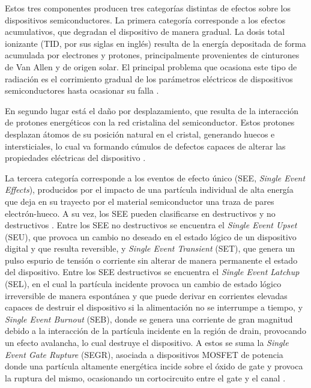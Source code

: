 Estos tres componentes producen tres categorías distintas de efectos sobre los dispositivos semiconductores. La primera categoría corresponde a los efectos acumulativos, que degradan el dispositivo de manera gradual. La dosis total ionizante (TID, por sus siglas en inglés) resulta de la energía depositada de forma acumulada por electrones y protones, principalmente provenientes de cinturones de Van Allen y de origen solar. El principal problema que ocasiona este tipo de radiación es el corrimiento gradual de los parámetros eléctricos de dispositivos semiconductores hasta ocasionar su falla \cite{mikaelian2001}. 

En segundo lugar está el daño por desplazamiento, que resulta de la interacción de protones energéticos con la red cristalina del semiconductor. Estos protones desplazan átomos de su posición natural en el cristal, generando huecos e intersticiales, lo cual va formando cúmulos de defectos capaces de alterar las propiedades eléctricas del dispositivo \cite{mikaelian2001}.
 
La tercera categoría corresponde a los eventos de efecto único (SEE, \textit{Single Event Effects}), producidos por el impacto de una partícula individual de alta energía que deja en su trayecto por el material semiconductor una traza de pares electrón-hueco. A su vez, los SEE pueden clasificarse en destructivos y no destructivos \cite{lauenstein2015}. Entre los SEE no destructivos se encuentra el \textit{Single Event Upset} (SEU), que provoca un cambio no deseado en el estado lógico de un dispositivo digital y que resulta reversible, y \textit{Single Event Transient} (SET), que genera un pulso espurio de tensión o corriente sin alterar de manera permanente el estado del dispositivo. Entre los SEE destructivos se encuentra el \textit{Single Event Latchup} (SEL), en el cual la partícula incidente provoca un cambio de estado lógico irreversible de manera espontánea y que puede derivar en corrientes elevadas capaces de destruir el dispositivo si la alimentación no se interrumpe a tiempo, y \textit{Single Event Burnout} (SEB), donde se genera una corriente de gran magnitud debido a la interacción de la partícula incidente en la región de drain, provocando un efecto avalancha, lo cual destruye el dispositivo. A estos se suma la \textit{Single Event Gate Rupture} (SEGR), asociada a dispositivos MOSFET de potencia donde una partícula altamente energética incide sobre el óxido de gate y provoca la ruptura del mismo, ocasionando un cortocircuito entre el gate y el canal \cite{mikaelian2001}.

